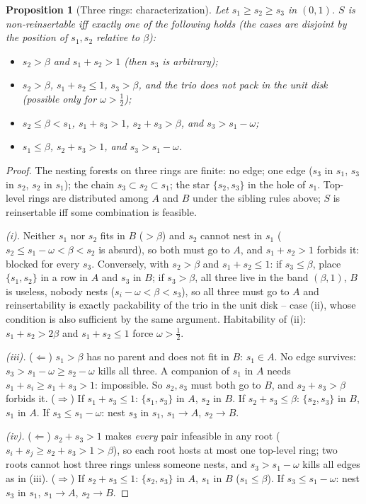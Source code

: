 \documentclass[11pt]{article}
\newtheorem{proposition}[theorem]{Proposition}
\theoremstyle{definition}
\begin{document}
\begin{proposition}[Three rings: characterization]\label{prop:Ctrichar}
Let $s_1\ge s_2\ge s_3$ in $(0,1)$. $S$ is non-reinsertable iff exactly one
of the following holds (the cases are disjoint by the position of $s_1,s_2$
relative to $\beta$):
\begin{itemize}\itemsep2pt
\item[(i)] $s_2>\beta$ and $s_1+s_2>1$ (then $s_3$ is arbitrary);
\item[(ii)] $s_2>\beta$, $s_1+s_2\le1$, $s_3>\beta$, and the trio does not
pack in the unit disk (possible only for $\omega>\tfrac12$);
\item[(iii)] $s_2\le\beta<s_1$, $s_1+s_3>1$, $s_2+s_3>\beta$, and
$s_3>s_1-\omega$;
\item[(iv)] $s_1\le\beta$, $s_2+s_3>1$, and $s_3>s_1-\omega$.
\end{itemize}
\end{proposition}
\begin{proof}
The nesting forests on three rings are finite: no edge; one edge ($s_3$ in
$s_1$, $s_3$ in $s_2$, $s_2$ in $s_1$); the chain $s_3\subset s_2\subset
s_1$; the star $\{s_2,s_3\}$ in the hole of $s_1$. Top-level rings are
distributed among $A$ and $B$ under the sibling rules above; $S$ is
reinsertable iff some combination is feasible.

\emph{(i).} Neither $s_1$ nor $s_2$ fits in $B$ ($>\beta$) and $s_2$ cannot
nest in $s_1$ ($s_2\le s_1-\omega<\beta<s_2$ is absurd), so both must go to
$A$, and $s_1+s_2>1$ forbids it: blocked for every $s_3$. Conversely, with
$s_2>\beta$ and $s_1+s_2\le1$: if $s_3\le\beta$, place $\{s_1,s_2\}$ in a
row in $A$ and $s_3$ in $B$; if $s_3>\beta$, all three live in the band
$(\beta,1)$, $B$ is useless, nobody nests ($s_i-\omega<\beta<s_3$), so all
three must go to $A$ and reinsertability is exactly packability of the trio
in the unit disk -- case (ii), whose condition is also sufficient by the
same argument. Habitability of (ii): $s_1+s_2>2\beta$ and $s_1+s_2\le1$
force $\omega>\tfrac12$.

\emph{(iii).} ($\Leftarrow$) $s_1>\beta$ has no parent and does not fit in
$B$: $s_1\in A$. No edge survives: $s_3>s_1-\omega\ge s_2-\omega$ kills all
three. A companion of $s_1$ in $A$ needs $s_1+s_i\ge s_1+s_3>1$: impossible.
So $s_2,s_3$ must both go to $B$, and $s_2+s_3>\beta$ forbids it.
($\Rightarrow$) If $s_1+s_3\le1$: $\{s_1,s_3\}$ in $A$, $s_2$ in $B$. If
$s_2+s_3\le\beta$: $\{s_2,s_3\}$ in $B$, $s_1$ in $A$. If $s_3\le
s_1-\omega$: nest $s_3$ in $s_1$, $s_1\to A$, $s_2\to B$.

\emph{(iv).} ($\Leftarrow$) $s_2+s_3>1$ makes \emph{every} pair infeasible
in any root ($s_i+s_j\ge s_2+s_3>1>\beta$), so each root hosts at most one
top-level ring; two roots cannot host three rings unless someone nests, and
$s_3>s_1-\omega$ kills all edges as in (iii). ($\Rightarrow$) If
$s_2+s_3\le1$: $\{s_2,s_3\}$ in $A$, $s_1$ in $B$ ($s_1\le\beta$). If
$s_3\le s_1-\omega$: nest $s_3$ in $s_1$, $s_1\to A$, $s_2\to B$.
\end{proof}
\end{document}

